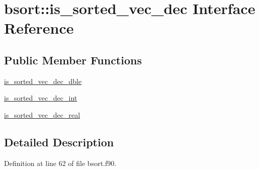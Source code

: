 \hypertarget{interfacebsort_1_1is__sorted__vec__dec}{\section{bsort\-:\-:is\-\_\-sorted\-\_\-vec\-\_\-dec Interface Reference}
\label{interfacebsort_1_1is__sorted__vec__dec}
}
\subsection*{Public Member Functions}
\begin{DoxyCompactItemize}
\item 
\hyperlink{interfacebsort_1_1is__sorted__vec__dec_abb276bd4a8382e54cd5894e7f6b7f475_abb276bd4a8382e54cd5894e7f6b7f475}{is\-\_\-sorted\-\_\-vec\-\_\-dec\-\_\-dble}
\item 
\hyperlink{interfacebsort_1_1is__sorted__vec__dec_a8d93d25c2fe0db3b8c68800adde3333b_a8d93d25c2fe0db3b8c68800adde3333b}{is\-\_\-sorted\-\_\-vec\-\_\-dec\-\_\-int}
\item 
\hyperlink{interfacebsort_1_1is__sorted__vec__dec_a88ac52de0e1ed3701b5fcefa151aa03c_a88ac52de0e1ed3701b5fcefa151aa03c}{is\-\_\-sorted\-\_\-vec\-\_\-dec\-\_\-real}
\end{DoxyCompactItemize}


\subsection{Detailed Description}


Definition at line 62 of file bsort.\-f90.



